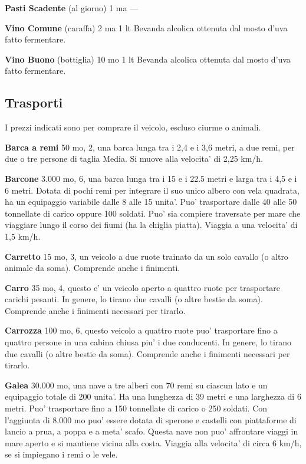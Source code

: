\documentclass[a4paper,11pt,twoside,openany]{book}
\begin{document}
{\textbf{Pasti Scadente} (al giorno) 1 ma ---

\textbf{Vino Comune} (caraffa) 2 ma 1 lt Bevanda alcolica ottenuta dal mosto d'uva fatto fermentare.

\textbf{Vino Buono} (bottiglia) 10 mo 1 lt Bevanda alcolica ottenuta dal mosto d'uva fatto fermentare.

\pagebreak

\subsection{Trasporti}

\label{trasporti}

I prezzi indicati sono per comprare il veicolo, escluso ciurme o animali.

\textbf{Barca a remi} 50 mo, 2, una barca lunga tra i 2,4 e i 3,6 metri, a due remi, per due o tre persone di taglia Media. Si muove alla velocita' di 2,25 km/h.

\textbf{Barcone} 3.000 mo, 6, una barca lunga tra i 15 e i 22.5 metri e larga tra i 4,5 e i 6 metri. Dotata di pochi remi per integrare il suo unico albero con vela quadrata, ha un equipaggio variabile dalle 8 alle 15 unita'. Puo' trasportare dalle 40 alle 50 tonnellate di carico oppure 100 soldati. Puo' sia compiere traversate per mare che viaggiare lungo il corso dei fiumi (ha la chiglia piatta). Viaggia a una velocita' di 1,5 km/h.

\textbf{Carretto} 15 mo, 3, un veicolo a due ruote trainato da un solo cavallo (o altro animale da soma). Comprende anche i finimenti.

\textbf{Carro} 35 mo, 4, questo e' un veicolo aperto a quattro ruote per trasportare carichi pesanti. In genere, lo tirano due cavalli (o altre bestie da soma). Comprende anche i finimenti necessari per tirarlo.

\textbf{Carrozza} 100 mo, 6, questo veicolo a quattro ruote puo' trasportare fino a quattro persone in una cabina chiusa piu' i due conducenti. In genere, lo tirano due cavalli (o altre bestie da soma). Comprende anche i finimenti necessari per tirarlo.

\textbf{Galea} 30.000 mo, una nave a tre alberi con 70 remi su ciascun lato e un equipaggio totale di 200 unita'. Ha una lunghezza di 39 metri e una larghezza di 6 metri.
Puo' trasportare fino a 150 tonnellate di carico o 250 soldati. Con l'aggiunta di 8.000 mo puo' essere dotata di sperone e castelli con piattaforme di lancio a prua, a poppa e a meta' scafo. Questa nave non puo' affrontare viaggi in mare aperto e si mantiene vicina alla costa.
Viaggia alla velocita' di circa 6 km/h, se si impiegano i remi o le vele.

}
\end{document}
